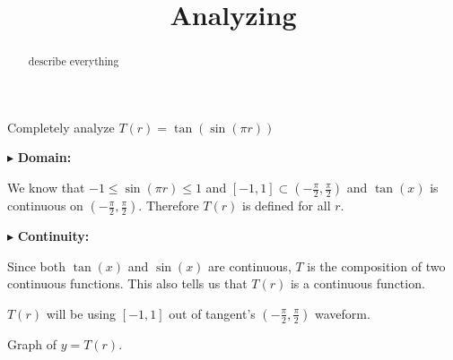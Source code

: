 \documentclass{ximera}
\title{Analyzing}
\begin{document}
\begin{abstract}
describe everything
\end{abstract}
\maketitle







Completely analyze $T(r) = \tan(\sin(\pi r))$ 




$\blacktriangleright$  \textbf{\textcolor{blue!55!black}{Domain: }}


We know that $-1 \leq \sin(\pi r) \leq 1$ and $[-1,1] \subset \left( -\frac{\pi}{2}, \frac{\pi}{2} \right)$ and $\tan(x)$ is continuous on $\left( -\frac{\pi}{2}, \frac{\pi}{2} \right)$.  Therefore $T(r)$ is defined for all $r$.  




$\blacktriangleright$  \textbf{\textcolor{blue!55!black}{Continuity: }}




Since both $\tan(x)$ and $\sin(x)$ are continuous, $T$ is the composition of two continuous functions. This also tells us that $T(r)$ is a continuous function.















$T(r)$ will be using $[-1,1]$ out of tangent's $\left( -\frac{\pi}{2}, \frac{\pi}{2} \right)$ waveform.



Graph of $y = T(r)$.
\end{document}
